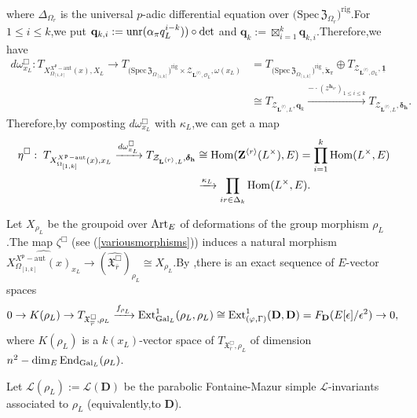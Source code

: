 \documentclass[SecEq,CM,GP]{degruyter-crelle} %
\theoremstyle{plain}
\newcommand{\Art}{{\rm Art}}
\newcommand{\complocaldefvarrhosub}{{ \widehat{\xfpxxl}}}
\newcommand{\Dpik}{{\mathbf{D}}}
\newcommand{\EndO}{{\rm End}}
\newcommand{\ext}{{\rm Ext}}
\newcommand{\gal}{{\rm Gal}}
\newcommand{\homo}{{\rm Hom}}
\newcommand{\lrr}{{\langle r\rangle}}
\newcommand{\omepik}{\Omega_{[1,k]}}
\newcommand{\rigch}{{\mathcal{Z}_{\bL^{\lrr},\mathcal{O}_L}}}
\newcommand{\rigchl}{{\mathcal{Z}_{\bL^{\lrr},L}}}
\newcommand{\sbanpik}{{\big(\mathrm{Spec}\hspace{2pt}\mathfrak{Z}_{\omepik}\big)^{\mathrm{rig}}}}
\newcommand{\unr}{{\rm unr}}
\newcommand{\xfpx}{X^{X^\fp-\mathrm{aut}}_{\omepik}(x)}
\newcommand{\xfpxxl}{X^{X^\fp-\mathrm{aut}}_{\omepik}(x)_{x_L}}
\newcommand{\bL}{{\mathbf{L}}}
\newcommand{\bZ}{{\mathbf{Z}}}
\newcommand{\bh}{{\mathbf{h}}}
\newcommand{\fp}{{\mathfrak{p}}}
\newcommand{\sL}{\mathcal L}
\begin{document}
where $\Delta_{\Omega_r}$ is the universal $p$-adic differential equation over $\big(\mathrm{Spec}\hspace{2pt}\mathfrak{Z}_{\Omega_r}\big)^{\mathrm{rig}}$.\;For  $1\leq i\leq k$,\;we put $\mathrm{\mathbf{q}}_{k,i}:=\unr(\alpha_\pi q_L^{i-k}))\circ\det$
and $\mathrm{\mathbf{q}}_k:=\boxtimes_{i=1}^k\mathrm{\mathbf{q}}_{k,i}$.\;Therefore,\;we have
\begin{equation}\label{tangentwxl2}
\begin{aligned}
	d\omega_{x_L}^\Box:	T_{\xfpx,X_L} \longrightarrow T_{\sbanpik\times \rigch,\omega(x_L)}&=T_{\sbanpik,\breve{\mathbf{{x}}}_\pi}\oplus T_{\rigch,\underline{\mathbf{1}}}\\
	&\cong T_{\rigchl,\mathrm{\mathbf{q}}_k}\xrightarrow{-\cdot (z^{\bh_{ir}})_{1\leq i\leq k}} T_{\rigchl,\bm{\delta}_{\bh}}.\;
\end{aligned}
\end{equation}		
Therefore,\;by composting $	d\omega_{x_L}^\Box$ with $\kappa_L$,\;we can get a map
\begin{equation}\label{tangentLinveta}
\begin{aligned}
	\eta^\Box:\;T_{\xfpx,x_L}\xrightarrow{d\omega_{x_L}^\Box}T_{\rigchl,\bm{\delta}_{\bh}}&\cong\homo(\bZ^{\lrr}(L^{\times}),E)=\prod_{i=1}^k\homo(L^{\times},E) \\
	&\xrightarrow{\kappa_L} \prod_{ir\in \Delta_k}\homo(L^\times,E).
\end{aligned}
\end{equation}

Let $X_{\rho_L}$ be the groupoid over $\Art_E$ of deformations of the group morphism $\rho_L$.\;The map $\zeta^{\Box}$ (see (\ref{variousmorphisms})) induces a  natural morphism $\complocaldefvarrhosub \rightarrow (\widehat{\mathfrak{X}_{\overline{r}}^\Box})_{\rho_L}\cong X_{\rho_L}$.\;By \cite[Lemma 4.13]{breuil2017smoothness},\;there is an exact sequence of $E$-vector spaces
\begin{equation}\label{dimcaluexatsequence}
0\rightarrow K(\rho_L)\rightarrow T_{\mathfrak{X}_{\overline{r}}^\Box,\rho_L}\xrightarrow{f_{\rho_L}} \ext^1_{\gal_L}(\rho_L,\rho_L)\cong \ext^1_{(\varphi,\Gamma)}(\Dpik,\Dpik)=F_{\Dpik}(E[\epsilon]/\epsilon^2)\rightarrow 0,\;
\end{equation}
where $K(\rho_L)$ is a $k(x_L)$-vector space of $T_{\mathfrak{X}_{\overline{r}}^\Box,\rho_L}$ of dimension $n^2-\dim_E\EndO_{\gal_L}(\rho_L)$.\;

Let $\sL(\rho_L):=\sL(\Dpik)$ be the parabolic Fontaine-Mazur simple $\sL$-invariants associated to $\rho_L$ (equivalently,\;to $\Dpik$).\;
\end{document}
